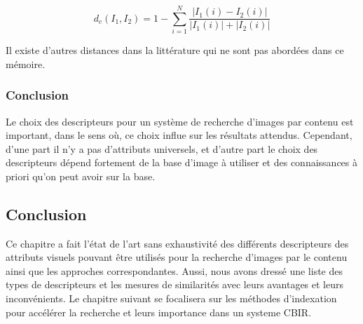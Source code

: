 \begin{equation}
	d_c(I_1, I_2) = 1- \sum_{i=1}^{N}   \frac{\left|{I}_{1}(i)-{I}_{2}(i)\right|}{\left|{I}_{1}(i)\right| + \left|{I}_{2}(i)\right|}
\end{equation}


Il existe d’autres distances dans la littérature qui ne sont pas abordées dans ce mémoire.

\subsubsection{Conclusion}
Le choix des descripteurs pour un système de recherche d'images par contenu est important,
dans le sens où, ce choix influe sur les résultats attendus. Cependant, d'une part il n'y a pas
d'attributs universels, et d'autre part le choix des descripteurs dépend fortement de la base
d'image à utiliser et des connaissances à priori qu'on peut avoir sur la base.
\subsection{Conclusion}
Ce chapitre a fait l’état de l’art sans exhaustivité des différents descripteurs des attributs visuels pouvant être utilisés pour la recherche d’images par le contenu ainsi que les approches correspondantes. Aussi, nous avons dressé une liste des types de descripteurs et les mesures de similarités avec leurs avantages et leurs inconvénients. Le chapitre suivant se focalisera sur les méthodes d'indexation pour accélérer la recherche et leurs importance dans un systeme CBIR.